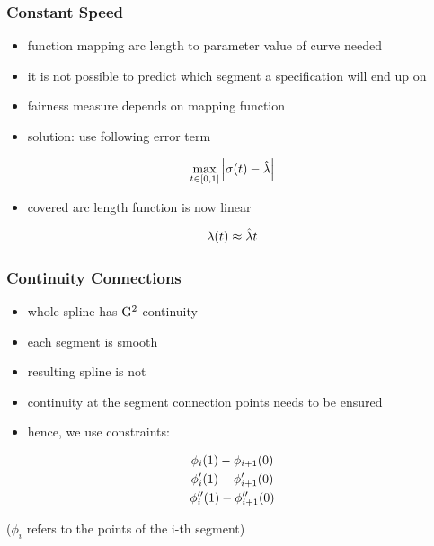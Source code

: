 \documentclass[mathserif]{beamer}
\begin{document}
		
		\begin{frame}
			\frametitle{Constant Speed}
			\begin{itemize}
				\item function mapping arc length to parameter value of curve needed
				\item it is not possible to predict which segment a specification will end up on
				\item fairness measure depends on mapping function
				\item solution: use following error term
			\end{itemize}
			
			\begin{equation*}
				\max_{t \in \left[ 0,1 \right]} \left| \sigma\!\left( t \right) - \hat{\lambda} \right|
			\end{equation*}
			
			\begin{itemize}
				\item covered arc length function is now linear
			\end{itemize}
			\begin{equation*}
				\lambda\!\left( t \right) \approx \hat{\lambda}t
			\end{equation*}
		\end{frame}
		
		\begin{frame}
			\frametitle{Continuity Connections}
			\begin{itemize}
				\item whole spline has \(\mathrm{G}^{2}\) continuity
				\item each segment is smooth
				\item resulting spline is not
				\item continuity at the segment connection points needs to be ensured
				\item hence, we use constraints:
			\end{itemize}
			\begin{equation*}
				\begin{gathered}
					\phi_i\!\left( 1 \right) - \phi_{i + 1}\!\left( 0 \right)\\
					\phi'_i\!\left( 1 \right) - \phi'_{i + 1}\!\left( 0 \right)\\
					\phi''_i\!\left( 1 \right) - \phi''_{i + 1}\!\left( 0 \right)
				\end{gathered}
			\end{equation*}
			
			(\(\phi_i\) refers to the points of the i-th segment)
		\end{frame}
		
\end{document}
